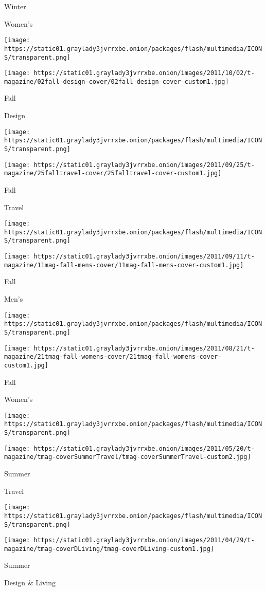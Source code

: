 Winter

Women's

\texttt{[image: https://static01.graylady3jvrrxbe.onion/packages/flash/multimedia/ICONS/transparent.png]}

\texttt{[image: https://static01.graylady3jvrrxbe.onion/images/2011/10/02/t-magazine/02fall-design-cover/02fall-design-cover-custom1.jpg]}

Fall

Design

\texttt{[image: https://static01.graylady3jvrrxbe.onion/packages/flash/multimedia/ICONS/transparent.png]}

\texttt{[image: https://static01.graylady3jvrrxbe.onion/images/2011/09/25/t-magazine/25falltravel-cover/25falltravel-cover-custom1.jpg]}

Fall

Travel

\texttt{[image: https://static01.graylady3jvrrxbe.onion/packages/flash/multimedia/ICONS/transparent.png]}

\texttt{[image: https://static01.graylady3jvrrxbe.onion/images/2011/09/11/t-magazine/11mag-fall-mens-cover/11mag-fall-mens-cover-custom1.jpg]}

Fall

Men's

\texttt{[image: https://static01.graylady3jvrrxbe.onion/packages/flash/multimedia/ICONS/transparent.png]}

\texttt{[image: https://static01.graylady3jvrrxbe.onion/images/2011/08/21/t-magazine/21tmag-fall-womens-cover/21tmag-fall-womens-cover-custom1.jpg]}

Fall

Women's

\texttt{[image: https://static01.graylady3jvrrxbe.onion/packages/flash/multimedia/ICONS/transparent.png]}

\texttt{[image: https://static01.graylady3jvrrxbe.onion/images/2011/05/20/t-magazine/tmag-coverSummerTravel/tmag-coverSummerTravel-custom2.jpg]}

Summer

Travel

\texttt{[image: https://static01.graylady3jvrrxbe.onion/packages/flash/multimedia/ICONS/transparent.png]}

\texttt{[image: https://static01.graylady3jvrrxbe.onion/images/2011/04/29/t-magazine/tmag-coverDLiving/tmag-coverDLiving-custom1.jpg]}

Summer

Design \& Living

